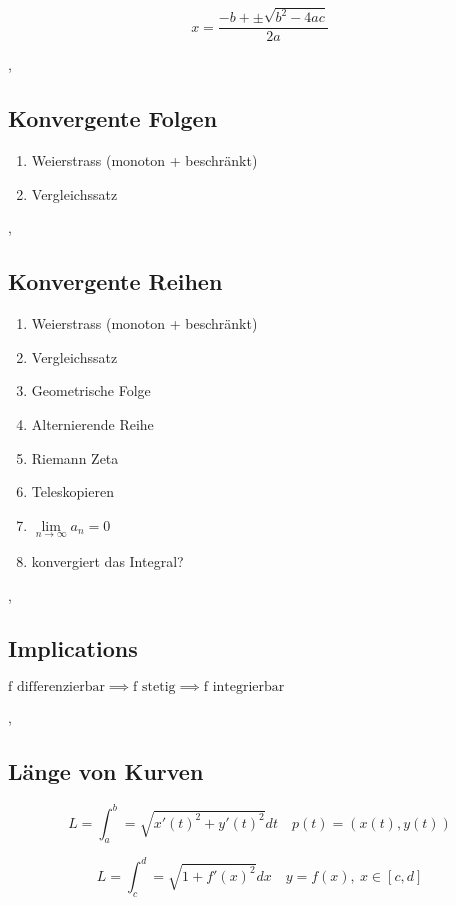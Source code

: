 \[ x = \frac{-b + \pm \sqrt{b^2 - 4 a c} }{2 a} \]

\sep

\subsection{Konvergente Folgen}
\begin{enumerate}
\item Weierstrass (monoton + beschränkt)
\item Vergleichssatz
\end{enumerate}

\sep

\subsection{Konvergente Reihen}

\begin{enumerate}
\item Weierstrass (monoton + beschränkt)
\item Vergleichssatz
\item Geometrische Folge
\item Alternierende Reihe
\item Riemann Zeta
\item Teleskopieren
\item $\lim \limits_{n \rightarrow \infty} a_n = 0$
\item konvergiert das Integral?
\end{enumerate}

\sep

\subsection{Implications}

\( \text{f differenzierbar} \implies \text{f stetig} \implies \text{f integrierbar} \)

\sep

\subsection{Länge von Kurven}

\[ L = \int_a^b = \sqrt{x'(t)^2 + y'(t)^2} dt  \quad p(t) = (x(t), y(t))\]

\[ L = \int_c^d = \sqrt{1 + f'(x)^2} dx \quad y = f(x), \ x \in [c, d] \]

